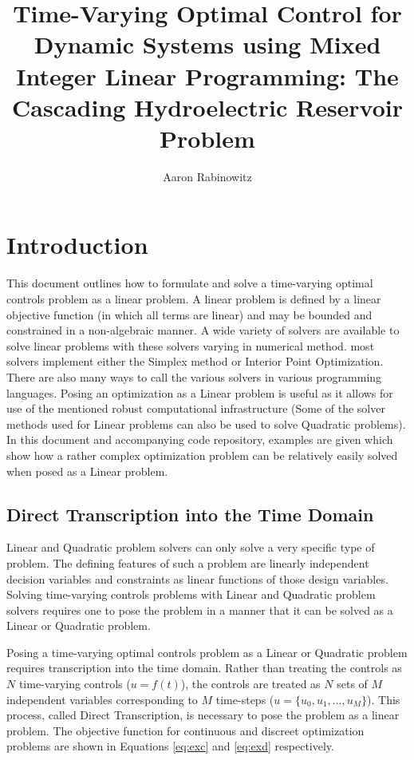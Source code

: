 \documentclass[12pt]{article}
\title{Time-Varying Optimal Control for Dynamic Systems using Mixed Integer Linear Programming: The Cascading Hydroelectric Reservoir Problem}
\author{Aaron Rabinowitz}
\date{}
\begin{document}
\maketitle

\section*{Introduction}

This document outlines how to formulate and solve a time-varying optimal controls problem as a linear problem. A linear problem is defined by a linear objective function (in which all terms are linear) and may be bounded and constrained in a non-algebraic manner. A wide variety of solvers are available to solve linear problems with these solvers varying in numerical method. most solvers implement either the Simplex method or Interior Point Optimization. There are also many ways to call the various solvers in various programming languages. Posing an optimization as a Linear problem is useful as it allows for use of the mentioned robust computational infrastructure (Some of the solver methods used for Linear problems can also be used to solve Quadratic problems). In this document and accompanying code repository, examples are given which show how a rather complex optimization problem can be relatively easily solved when posed as a Linear problem.

\subsection*{Direct Transcription into the Time Domain}

Linear and Quadratic problem solvers can only solve a very specific type of problem. The defining features of such a problem are linearly independent decision variables and constraints as linear functions of those design variables. Solving time-varying controls problems with Linear and Quadratic problem solvers requires one to pose the problem in a manner that it can be solved as a Linear or Quadratic problem.

Posing a time-varying optimal controls problem as a Linear or Quadratic problem requires transcription into the time domain. Rather than treating the controls as $N$ time-varying controls ($u=f(t)$), the controls are treated as $N$ sets of $M$ independent variables corresponding to $M$ time-steps ($u=\{u_0,u_1,\dots,u_M\}$). This process, called Direct Transcription, is necessary to pose the problem as a linear problem. The objective function for  continuous and discreet optimization problems are shown in Equations \eqref{eq:exc} and \eqref{eq:exd} respectively.
\end{document}
